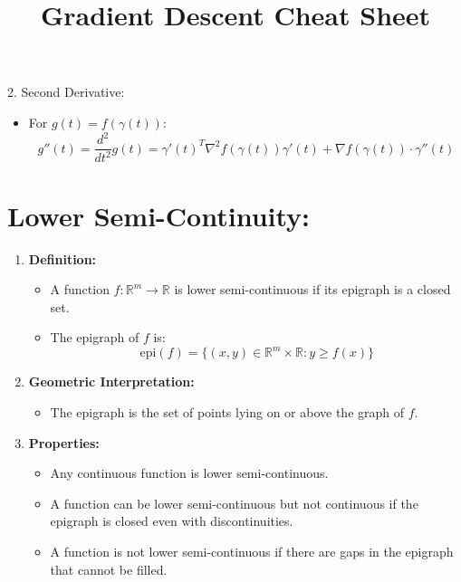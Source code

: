 \documentclass{article}
\begin{document}
2. Second Derivative:
\begin{itemize}
    \item For \( g(t) = f(\gamma(t)) \):
\[
g''(t) = \frac{d^2}{dt^2} g(t) = \gamma'(t)^T \nabla^2 f(\gamma(t)) \gamma'(t) + \nabla f(\gamma(t)) \cdot \gamma''(t)
\]
\end{itemize}




\section*{Lower Semi-Continuity:}

\begin{enumerate}
    \item \textbf{Definition:}
    \begin{itemize}
        \item A function $f : \mathbb{R}^m \to \mathbb{R}$ is lower semi-continuous if its epigraph is a closed set.
        \item The epigraph of $f$ is:
        \[
        \text{epi}(f) = \{(x,y) \in \mathbb{R}^m \times \mathbb{R} : y \geq f(x)\}
        \]
    \end{itemize}
    
    \item \textbf{Geometric Interpretation:}
    \begin{itemize}
        \item The epigraph is the set of points lying on or above the graph of $f$.
    \end{itemize}
    
    \item \textbf{Properties:}
    \begin{itemize}
        \item Any continuous function is lower semi-continuous.
        \item A function can be lower semi-continuous but not continuous if the epigraph is closed even with discontinuities.
        \item A function is not lower semi-continuous if there are gaps in the epigraph that cannot be filled.
    \end{itemize}
\end{enumerate}










\title{Gradient Descent Cheat Sheet}
\maketitle
\end{document}
